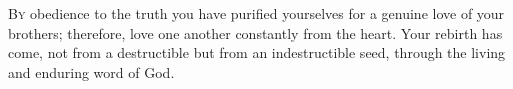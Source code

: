 
\lettrine{B}{y} obedience to the truth you have purified yourselves for a genuine love of your brothers; therefore, love one another constantly from the heart. Your rebirth has come, not from a destructible but from an indestructible seed, through the living and enduring word of God.